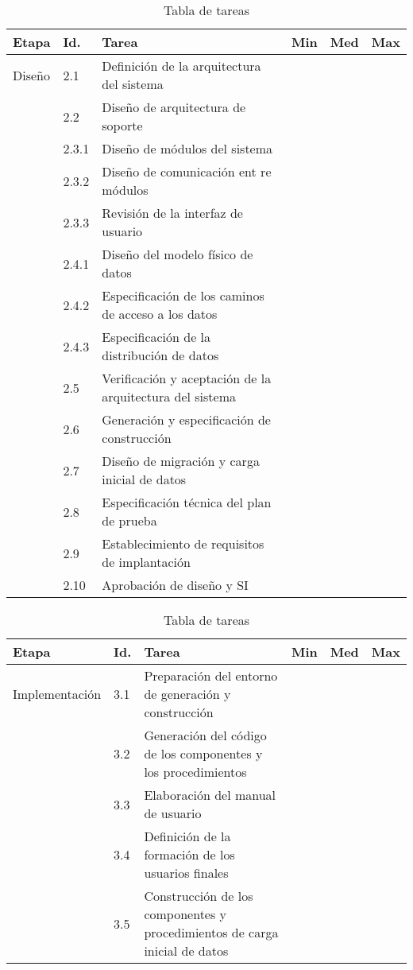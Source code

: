 \documentclass[11pt,a4paper,spanish,twoside]{report}
\begin{document}
\begin{table}[!h]
\centering
  \begin{tabular}{p{1.6cm}|p{1cm}|p{5cm}|p{1cm}|p{1cm}|p{1cm}}
    \textbf{Etapa} & \textbf{Id.} & \textbf{Tarea} & \textbf{Min} &
    \textbf{Med} & \textbf{Max}\\
    \hline
    Diseño & 2.1 & Definición de la arquitectura del sistema\\
    \cline{2-3}
    & 2.2 & Diseño de arquitectura de soporte\\
    \cline{2-3}
    & 2.3.1 & Diseño de módulos del sistema\\
    \cline{2-3}
    & 2.3.2 & Diseño de comunicación ent
re módulos\\
    \cline{2-3}
    & 2.3.3 & Revisión de la interfaz de usuario\\
    \cline{2-3}
    & 2.4.1 & Diseño del modelo físico de datos\\
    \cline{2-3}
    & 2.4.2 & Especificación de los caminos de acceso a los datos\\
    \cline{2-3}
    & 2.4.3 & Especificación de la distribución de datos\\
    \cline{2-3}
    & 2.5 & Verificación y aceptación de la arquitectura del sistema\\
    \cline{2-3}
    & 2.6 & Generación y especificación de construcción\\
    \cline{2-3}
    & 2.7 & Diseño de migración y carga inicial de datos\\
    \cline{2-3}
    & 2.8 & Especificación técnica del plan de prueba\\
    \cline{2-3}
    & 2.9 & Establecimiento de requisitos de implantación\\
    \cline{2-3}
    & 2.10 & Aprobación de diseño y SI\\
  \end{tabular}
  \caption{Tabla de tareas} \label{Tab:tareas2}
\end{table}

\begin{table}[!h]
\centering
  \begin{tabular}{p{1.6cm}|p{1cm}|p{5cm}|p{1cm}|p{1cm}|p{1cm}}
    \textbf{Etapa} & \textbf{Id.} & \textbf{Tarea} & \textbf{Min} &
    \textbf{Med} & \textbf{Max}\\
    \hline
    Implemen\-tación & 3.1 & Preparación del entorno de generación y
    construcción\\
    \cline{2-3}
    & 3.2 & Generación del código de los componentes y los procedimientos\\
    \cline{2-3}
    & 3.3 & Elaboración del manual de usuario\\
    \cline{2-3}
    & 3.4 & Definición de la formación de los usuarios finales\\
    \cline{2-3}
    & 3.5 & Construcción de los componentes y procedimientos de carga inicial
    de datos \\
  \end{tabular}
  \caption{Tabla de tareas} \label{Tab:tareas3}
\end{table}
\end{document}
